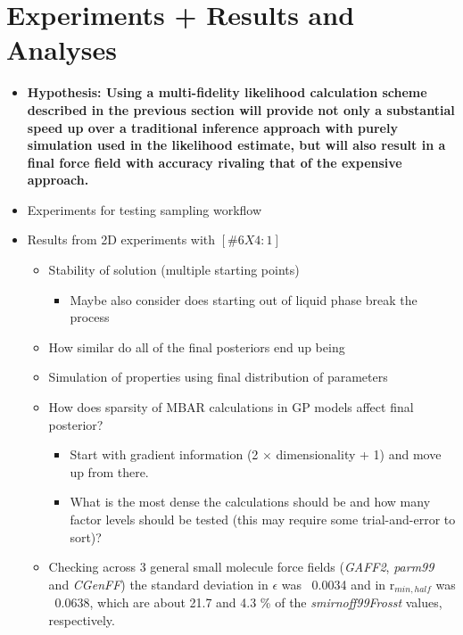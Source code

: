 \documentclass[aps,pre,nofootinbib,superscriptaddress,linenumbers,10pt, draft,tightenlines]{revtex4-1}
\begin{document}
\section{Experiments + Results and Analyses}
\begin{itemize}
	\item \textbf{Hypothesis: Using a multi-fidelity likelihood calculation scheme described in the previous section will provide not only a substantial
	      speed up over a traditional inference approach with purely simulation used in the likelihood estimate, but 
	      will also result in a final force field with accuracy rivaling that of the expensive approach.}
	\item Experiments for testing sampling workflow
        \item Results from 2D experiments with $[\#6X4:1]$
        \begin{itemize}
            \item Stability of solution (multiple starting points)
            \begin{itemize}
                \item Maybe also consider does starting out of liquid phase break the process 
            \end{itemize}
            \item How similar do all of the final posteriors end up being
            \item Simulation of properties using final distribution of parameters
            \item How does sparsity of MBAR calculations in GP models affect final posterior?
            \begin{itemize}
                \item Start with gradient information (2 $\times$ dimensionality + 1) and move up
                      from there.
                \item What is the most dense the calculations should be and how many factor
                      levels should be tested (this may require some trial-and-error to sort)?
            \end{itemize}
            \item Checking across 3 general small molecule force fields (\textit{GAFF2},
                  \textit{parm99} and \textit{CGenFF}) the standard 
                  deviation in $\epsilon$ was ~0.0034 and in
                  r$_{min,half}$ was ~0.0638, which are about 21.7 and 4.3 \% of the 
                  \textit{smirnoff99Frosst} values, respectively.

\end{itemize}
\end{itemize}
\end{document}
